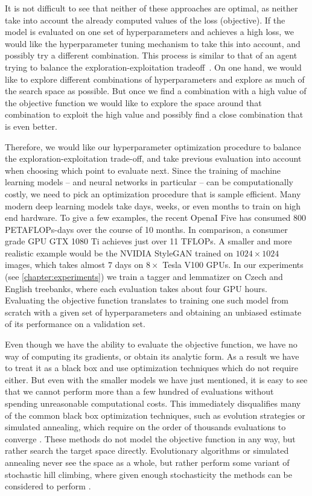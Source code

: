 It is not difficult to see that neither of these approaches are optimal, as neither
take into account the already computed values of the loss (objective). If the model
is evaluated on one set of hyperparameters and achieves a high loss, we would
like the hyperparameter tuning mechanism to take this into account, and
possibly try a different combination. This process is similar to that of an
agent trying to balance the exploration-exploitation
tradeoff~\citep{russell2016artificial}.  On one hand, we would like to explore
different combinations of hyperparameters and explore as much of the search
space as possible.  But once we find a combination with a high value of the
objective function we would like to explore the space around that combination
to exploit the high value and possibly find a close combination that is even
better.

Therefore, we would like our hyperparameter optimization procedure to balance the exploration-exploitation trade-off, and take previous
evaluation into account when choosing which point to evaluate next. Since the
training of machine learning models -- and neural networks in particular -- can
be computationally costly, we need to pick an optimization procedure that is
sample efficient. Many modern deep learning models take days,
weeks, or even months to train on high end hardware. To give a few examples,
the recent OpenaI Five \citep{openai-five} has consumed $800$ PETAFLOPs-days
over the course of 10 months. In comparison, a consumer grade GPU GTX 1080 Ti
achieves just over 11 TFLOPs. A smaller and more realistic example would be the
NVIDIA StyleGAN \citep{nvidia-stylegan} trained on $1024\times1024$ images,
which takes almost $7$ days on $8\times$ Tesla V100 GPUs. In our experiments (see
\autoref{chapter:experiments}) we train a tagger and lemmatizer on Czech and
English treebanks, where each evaluation takes about four GPU hours. Evaluating
the objective function translates to training one such model from scratch with a
given set of hyperparameters and obtaining an unbiased estimate of its performance
on a validation set.

Even though we have the ability to evaluate the objective function, we have no
way of computing its gradients, or obtain its analytic form. As a result we
have to treat it as a black box and use optimization techniques which do not
require either. But even with the smaller models we have just mentioned, it is easy
to see that we cannot perform more than a few hundred of evaluations without
spending unreasonable computational costs. This immediately
disqualifies many of the common black box optimization techniques, such as
evolution strategies or simulated annealing, which require on the order of
thousands evaluations to converge \citep{google-vizier}. These methods do not model the objective function in any way, but rather search the target space directly. Evolutionary algorithms or simulated annealing never see the space as a whole, but rather perform some variant of stochastic hill climbing, where given enough stochasticity the methods can be considered to perform .

